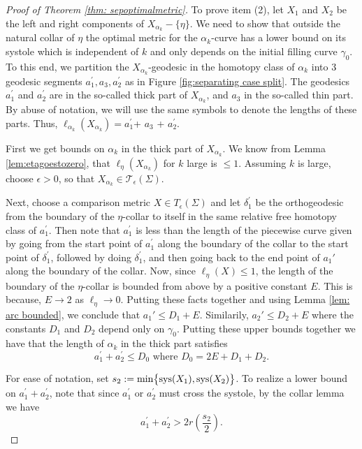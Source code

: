 \documentclass[12pt]{amsart}
\numberwithin{equation}{section}
\theoremstyle{plain}
\begin{document}
\begin{proof}[Proof of Theorem \ref{thm: sepoptimalmetric}]
To prove item (2),  let $X_{1}$ and $X_{2}$ be the left and right components of $X_{\alpha_{k}}-\{\eta\}$.
We need to show  that outside the natural collar of  
$\eta$  the optimal metric for the $\alpha_{k}$-curve  has  a lower bound on its systole which is independent of $k$ and only depends on the initial filling curve  $\gamma_{0}$. To this end,  we partition the 
$X_{\alpha_{k}}$-geodesic in the homotopy class of $\alpha_{k}$ 
into 3 geodesic segments  $a_1^{\prime}, a_3, a_2^{\prime}$ as in Figure \ref{fig:separating case split}. The geodesics  $a_1^{\prime}$ and $a_2^{\prime}$  are in the so-called thick part of $X_{\alpha_{k}}$, and 
$a_3$  in the so-called thin part.
 By abuse of notation, we will use the same symbols to denote the lengths of these parts. Thus, 
$\ell_{\alpha_k}(X_{\alpha_k})= a_{1}^{\prime}$+ $a_{3}$ + $a_{2}^{\prime}  $.

First we get bounds on $\alpha_{k}$ in the thick part
of $X_{\alpha_{k}}$. We know from Lemma \ref{lem:etagoestozero}, that $\ell_{\eta}(X_{\alpha_k})$ for $k$ large is  $ \leq 1$. Assuming $k$ is large, choose $\epsilon >0$, so that
$X_{\alpha_k} \in \mathcal{T}_{\epsilon}(\Sigma)$.


Next,  choose a comparison metric $X \in T_{\epsilon}(\Sigma)$
and let $\delta^{\prime}_{1}$ be the orthogeodesic from the boundary of the $\eta$-collar to itself in the same relative free homotopy class of $a_1^{\prime}$. Then note  that $a_{1}^{\prime}$ is less than the length of the piecewise curve given by going from the start point of $a_{1}^{\prime}$ along the boundary of the collar to the start point of $\delta_{1}^{\prime}$, followed by doing $\delta_{1}^{\prime}$,  and then going back to the end point of $a_1'$ along the boundary of the collar.
Now, since $\ell_{\eta}(X)\leq {1}$, the length of the boundary of the $\eta$-collar is bounded from above by a positive constant $E$. This is because, $E \rightarrow 2$ as $\ell_{\eta} \rightarrow 0$.
Putting these facts together and using Lemma
\ref{lem: arc bounded}, we  conclude that $a_1' \leq D_1 + E$. Similarily, $a_2' \leq D_2 + E$  where the constants $D_1$ and $D_2$ depend only on $\gamma_0$. Putting these upper bounds together we  have that the length of $\alpha_{k}$ in the thick part satisfies
\begin{equation}\label{eq:thickpart upper}
a_{1}^{\prime} + a_{2}^{\prime} \leq D_0
\text{    where } D_0=2E + D_1 + D_2.
\end{equation}

For ease of notation, set $s_2 :=\text{min} \big\{\textup{sys} (X_{1}),
\textup{sys}(X_{2})\big\}$.
To realize  a lower bound on $a_{1}^{\prime} + a_{2}^{\prime}$, note that
since $a_{1}^{\prime}$ or $a_{2}^{\prime}$ must cross the systole,  by the collar lemma we have
\begin{equation}\label{eq:thickpart lower}
a_{1}^{\prime} + a_{2}^{\prime}
>2r\left(\frac{s_2}{2}\right).
\end{equation}



\end{proof}
\end{document}
